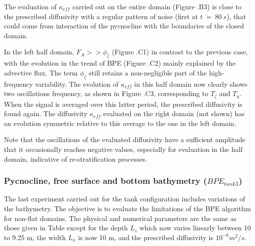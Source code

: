 The evaluation of $\kappa_{eff}$ carried out on the entire domain (Figure .B3) is close to the prescribed diffusivity with a regular pattern of noise (first at $t\ =\ 80\ s$), that could come from interaction of the pycnocline with the boundaries of the closed domain.

In the left half domain, $F_A>>\phi_{\zeta}$ (Figure .C1) in contrast to the previous case, with the evolution in the trend of BPE (Figure .C2) mainly explained by the advective flux. The term $\phi_{\zeta}$ still retains a non-negligible part of the high-frequency variability. The evolution of $\kappa_{eff}$ in this half domain now clearly shows two oscillations frequency, as shown in Figure .C3, corresponding to $T_{\zeta}$ and $T_{\eta}$. When the signal is averaged over this latter period, the prescribed diffusivity is found again. The diffusivity $\kappa_{eff}$ evaluated on the right domain (not shown) has an evolution symmetric relative to this average to the one in the left domain.

\color{red}Note that the oscillations of the evaluated diffusivity have a sufficient amplitude that it occasionally reaches negative values, especially for evaluation in the half domain, indicative of re-stratification processes.\color{black}

\subsubsection{Pycnocline, free surface and bottom bathymetry ($BPE_{tank3}$)}
The last experiment carried out for the tank configuration includes variations of the bathymetry. The objective is to evaluate the limitations of the BPE algorithm for non-flat domains. The physical and numerical parameters are the same as those given in Table  except for the depth $L_z$ which now varies linearly between 10 to 9.25 m, the width $L_x$ is now 10 m, and the prescribed diffusivity is $10^{-6}m^2/s$.

